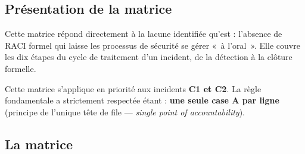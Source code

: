 \documentclass[12pt,a4paper]{article}
\begin{document}
\subsection{Présentation de la matrice}

Cette matrice répond directement à la lacune identifiée qu'est : l'absence de RACI formel qui laisse les processus de sécurité se
gérer «~à l'oral~». Elle couvre les dix étapes du cycle de traitement
d'un incident, de la détection à la clôture formelle.

\begin{boxaction}
Cette matrice s'applique en priorité aux incidents \textbf{C1 et C2}.
La règle fondamentale a strictement respectée étant :
\textbf{une seule case A par ligne} (principe de l'unique tête de file
--- \textit{single point of accountability}).
\end{boxaction}

\vspace{0.4cm}

\subsection{La matrice}

\legendeRACI
\end{document}
